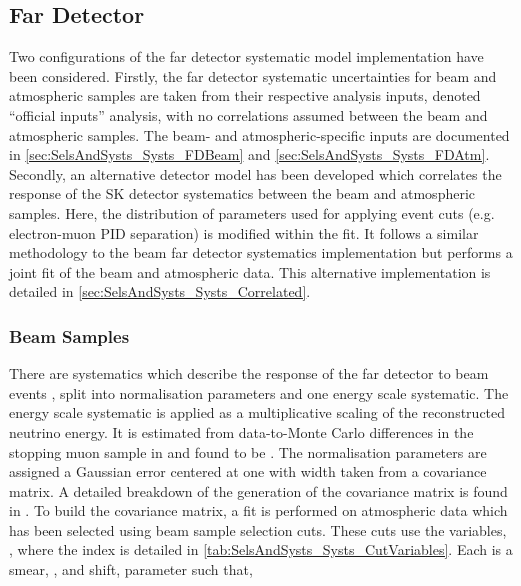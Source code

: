\subsection{Far Detector}
\label{sec:SelsAndSysts_Systs_FD}

Two configurations of the far detector systematic model implementation have been considered. Firstly, the far detector systematic uncertainties for beam and atmospheric samples are taken from their respective analysis inputs, denoted ``official inputs'' analysis, with no correlations assumed between the beam and atmospheric samples. The beam- and atmospheric-specific inputs are documented in \autoref{sec:SelsAndSysts_Systs_FDBeam} and \autoref{sec:SelsAndSysts_Systs_FDAtm}. Secondly, an alternative detector model has been developed which correlates the response of the SK detector systematics between the beam and atmospheric samples. Here, the distribution of parameters used for applying event cuts (e.g. electron-muon PID separation) is modified within the fit. It follows a similar methodology to the beam far detector systematics implementation but performs a joint fit of the beam and atmospheric data. This alternative implementation is detailed in \autoref{sec:SelsAndSysts_Systs_Correlated}.

\subsubsection{Beam Samples}
\label{sec:SelsAndSysts_Systs_FDBeam}


There are  systematics which describe the response of the far detector to beam events \cite{t2k_tn_399}, split into  normalisation parameters and one energy scale systematic. The energy scale systematic is applied as a multiplicative scaling of the reconstructed neutrino energy. It is estimated from data-to-Monte Carlo differences in the stopping muon sample in \cite{sk_2017} and found to be . The normalisation parameters are assigned a Gaussian error centered at one with width taken from a covariance matrix. A detailed breakdown of the generation of the covariance matrix is found in \cite{t2k_tn_318}. To build the covariance matrix, a fit is performed on atmospheric data which has been selected using beam sample selection cuts. These cuts use the variables, , where the index  is detailed in \autoref{tab:SelsAndSysts_Systs_CutVariables}. Each  is a smear, \quickmath{\alpha}, and shift, \quickmath{\beta} parameter such that,


